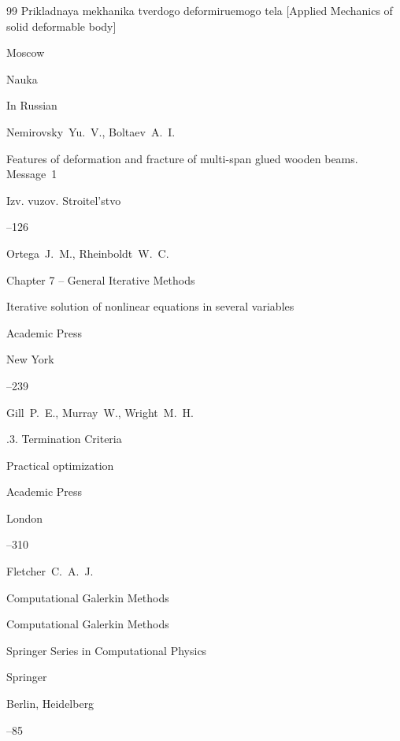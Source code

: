\begin{thebibliography}{99}
\book Prikladnaya mekhanika tverdogo deformiruemogo tela \rm  [Applied Mechanics of solid deformable body]


\publaddr Moscow

\publ Nauka








\lang In Russian

\by Nemirovsky~Yu.~V., Boltaev~A.~I. 

\paper Features of deformation and fracture of multi-span glued wooden beams. Message~1

\jour Izv. vuzov. Stroitel'stvo



--126








\by Ortega~J.~M.,  Rheinboldt~W.~C.

\paper Chapter 7 – General Iterative Methods 

\inbook Iterative solution of nonlinear equations in several variables


\publ Academic Press

\publaddr New York

–239





\by Gill~P.~E., Murray~W., Wright~M.~H.

.3. Termination  Criteria

\inbook Practical optimization


\publ Academic Press

\publaddr London

--310




\by Fletcher~C.~A.~J.


\paper Computational Galerkin Methods

\inbook Computational Galerkin Methods

\serial Springer Series in Computational Physics

\publ Springer

\publaddr Berlin, Heidelberg


--85







\end{thebibliography}



%

